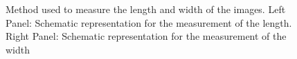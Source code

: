 \begin{figure}[!htp]
\caption{\label{measure_arcs} Method used to measure the length
and width of the images. Left Panel: Schematic representation for the
measurement of the length. Right Panel: Schematic representation for the
measurement of the width}
\end{figure}


